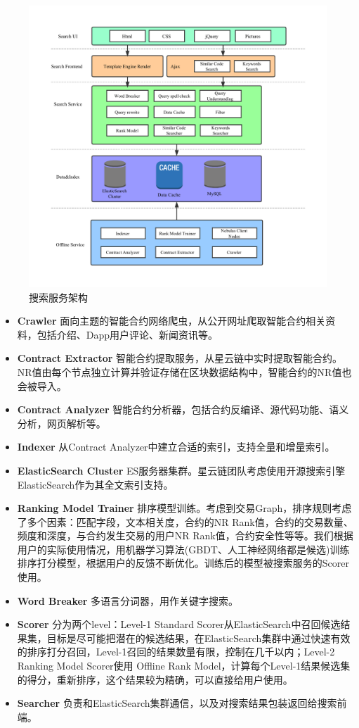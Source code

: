 \begin{figure}
\centering
\includegraphics[width=16cm]{./figs/search-arch}
\caption{搜索服务架构}
\label{fig:search-arch}
\end{figure}

\begin{itemize}
	\item \textbf{Crawler} 面向主题的智能合约网络爬虫，从公开网址爬取智能合约相关资料，包括介绍、Dapp用户评论、新闻资讯等。
	\item \textbf{Contract Extractor} 智能合约提取服务，从星云链中实时提取智能合约。NR值由每个节点独立计算并验证存储在区块数据结构中，智能合约的NR值也会被导入。
	\item \textbf{Contract Analyzer} 智能合约分析器，包括合约反编译、源代码功能、语义分析，网页解析等。
	\item \textbf{Indexer} 从Contract Analyzer中建立合适的索引，支持全量和增量索引。
	\item \textbf{ElasticSearch Cluster} ES服务器集群。星云链团队考虑使用开源搜索引擎ElasticSearch作为其全文索引支持。
	\item \textbf{Ranking Model Trainer} 排序模型训练。考虑到交易Graph，排序规则考虑了多个因素：匹配字段，文本相关度，合约的NR Rank值，合约的交易数量、频度和深度，与合约发生交易的用户NR Rank值，合约安全性等等。我们根据用户的实际使用情况，用机器学习算法(GBDT、人工神经网络都是候选)训练排序打分模型，根据用户的反馈不断优化。训练后的模型被搜索服务的Scorer使用。
	\item \textbf{Word Breaker} 多语言分词器，用作关键字搜索。
	\item \textbf{Scorer} 分为两个level：Level-1 Standard Scorer从ElasticSearch中召回候选结果集，目标是尽可能把潜在的候选结果，在ElasticSearch集群中通过快速有效的排序打分召回，Level-1召回的结果数量有限，控制在几千以内；Level-2 Ranking Model Scorer使用 Offline Rank Model，计算每个Level-1结果候选集的得分，重新排序，这个结果较为精确，可以直接给用户使用。
	\item \textbf{Searcher} 负责和ElasticSearch集群通信，以及对搜索结果包装返回给搜索前端。
\end{itemize}


